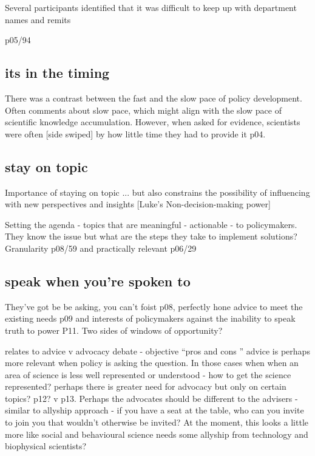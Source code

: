 Several participants identified that it was difficult to keep up with department names and remits 


p05/94


\subsection{its in the timing}
There was a contrast between the fast and the slow pace of policy development. Often comments about slow pace, which might align with the slow pace of scientific knowledge accumulation. However, when asked for evidence, scientists were often [side swiped] by how little time they had to provide it p04.  

\subsection{stay on topic}
Importance of staying on topic ... but also constrains the possibility of influencing with new perspectives and insights [Luke's Non-decision-making power]

Setting the agenda - topics that are meaningful - actionable - to policymakers. They know the issue but what are the steps they take to implement solutions? Granularity p08/59 and practically relevant p06/29


\subsection{speak when you're spoken to}
They've got be be asking, you can't foist p08, perfectly hone advice to meet the existing needs p09 and interests of policymakers against the inability to speak truth to power P11. Two sides of windows of opportunity?

relates to advice v advocacy debate - objective ``pros and cons '' advice is perhaps more relevant when policy is asking the question. In those cases when when an area of science is less well represented or understood - how to get the science represented? perhaps there is greater need for advocacy but only on certain topics? p12? v p13. Perhaps the advocates should be different to the advisers - similar to allyship approach - if you have a seat at the table, who can you invite to join you that wouldn't otherwise be invited? At the moment, this looks a little more like social and behavioural science needs some allyship from technology and biophysical scientists?

